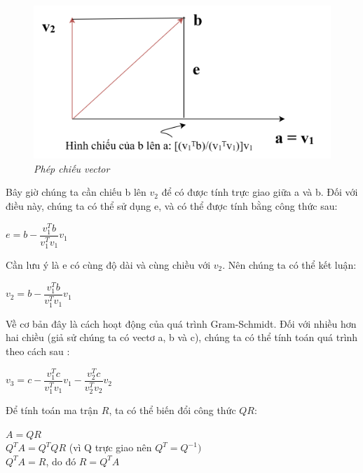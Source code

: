 \begin{figure}[!ht]
	\centering
	\includegraphics[scale=0.27]{hinhchieu}
	\caption{\textit{Phép chiếu vector}}\label{fig:Picture}
\end{figure}
Bây giờ chúng ta cần chiếu b lên $v_2$ để có được tính trực giao giữa a và b. Đối với điều 
này, chúng ta có thể sử dụng e, và có thể được tính bằng 
công thức sau:
\\
\begin{center}
	$e=b-\dfrac{v_1^{T}b}{v_1^{T}v_1}v_1$
\end{center}
Cần lưu ý là e có cùng độ dài và cùng chiều với $v_2$. Nên chúng ta có thể kết luận:\\
\begin{center}
	$v_2=b-\dfrac{v_1^{T}b}{v_1^{T}v_1}v_1$
\end{center}
Về cơ bản đây là cách hoạt động của quá trình Gram-Schmidt. Đối với nhiều hơn hai 
chiều (giả sử chúng ta có vectơ a, b và c), chúng ta có thể tính toán quá trình theo cách 
sau :\\
\begin{center}
	$v_3=c-\dfrac{v_1^{T}c}{v_1^{T}v_1}v_1-\dfrac{v_2^{T}c}{v_2^{T}v_2}v_2$
\end{center}

Để tính toán ma trận $R$, ta có thể biến đổi công thức $QR$:\\
\begin{center}
	$A=QR$\\
	$Q^{T}A=Q^{T}QR $ (vì Q trực giao nên $Q^{T}=Q^{-1})$\\
	$Q^{T}A=R$, do đó $R=Q^{T}A$
\end{center}
